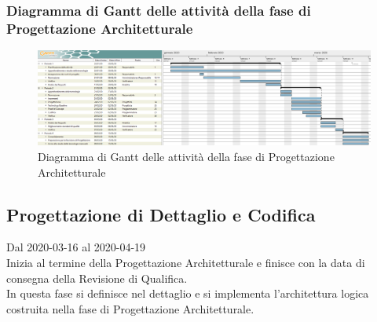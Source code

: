 \newpage
\begin{landscape}
\subsubsection{Diagramma di Gantt delle attività della fase di Progettazione Architetturale}
\pagestyle{empty}
\begin{figure}[h]
	\centering
	\includegraphics[scale=1.48]{Sezioni/DiagrammiGantt/ProgettazioneArchitetturale.png}
	\caption{Diagramma di Gantt delle attività della fase di Progettazione Architetturale}	
\end{figure}
\end{landscape}

\subsection{Progettazione di Dettaglio e Codifica}
Dal 2020-03-16 al 2020-04-19\\
Inizia al termine della Progettazione Architetturale e finisce con la data di consegna della Revisione di Qualifica.\\
In questa fase si definisce nel dettaglio e si implementa l'architettura logica costruita nella fase di Progettazione Architetturale.\\


